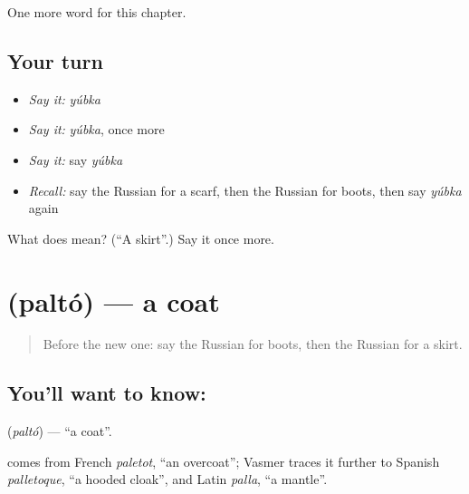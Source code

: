 \begin{grammarlens}[title={What you've built}]
One more word for this chapter.
\end{grammarlens}

\subsection*{Your turn}
\begin{itemize}
\raggedright
  \item \emph{Say it:} \emph{yúbka}
  \item \emph{Say it:} \emph{yúbka}, once more
  \item \emph{Say it:} say \emph{yúbka}
  \item \emph{Recall:} say the Russian for a scarf, then the Russian for boots, then say \emph{yúbka} again
\end{itemize}

\begin{tcolorbox}[breakable,colback=teal!4,colframe=teal!35!black,title={Before you move on}]
What does  mean? (\textquotedblleft{}A skirt\textquotedblright{}.) Say it once more.
\end{tcolorbox}
\section[\texorpdfstring{\ru{пальто} (paltó)}{пальто (paltó)}]{ (paltó) — a coat}

\label{lesson:RU-C102-coat}



\begin{quote}
Before the new one: say the Russian for boots, then the Russian for a skirt.
\end{quote}

\subsection*{You'll want to know: }
\textbf{} (\emph{paltó}) — \textquotedblleft{}a coat\textquotedblright{}.

\begin{cousinweb}
\textbf{} comes from French \emph{paletot}, \textquotedblleft{}an overcoat\textquotedblright{}; Vasmer traces it further to Spanish \emph{palletoque}, \textquotedblleft{}a hooded cloak\textquotedblright{}, and Latin \emph{palla}, \textquotedblleft{}a mantle\textquotedblright{}.
\end{cousinweb}

